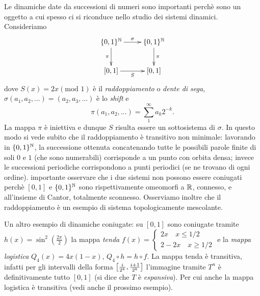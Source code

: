 \begin{esempio} Le dinamiche date da successioni di numeri sono importanti perchè sono un oggetto a cui 
spesso ci si riconduce nello studio dei sistemi dinamici. Consideriamo
\[ \xymatrix{ \{0,1\}^\N \ar[r]^\sigma \ar[d]_\pi & \{0,1\}^\N \ar[d]^\pi \\ [0,1] \ar[r]_S & [0,1] } \]
 dove $S(x)=2x(\mbox{mod } 1)$ è il \emph{raddoppiamento} o \emph{dente di sega}, $\sigma(a_1,a_2,\dots)=(a_2,a_3,\dots)$ è lo \emph{shift} e 
 \[\pi(a_1,a_2,\dots)=\sum_1^\infty a_k 2^{-k}.\]
 La mappa $\pi$ è iniettiva e dunque $S$ risulta essere un sottosistema di $\sigma$. In questo modo si vede subito che il raddoppiamento è transitivo non minimale: 
 lavorando in $\{0,1\}^{\mathbb{N}}$, la successione ottenuta concatenando tutte le possibili parole finite di soli $0$ e $1$ (che sono numerabili) corrisponde a un punto con orbita densa; 
 invece le successioni periodiche corrispondono a punti periodici (se ne trovano di ogni ordine). 
 \Eacc importante osservare che i due sistemi non possono essere coniugati perchè $[0,1]$ e $\{0,1\}^{\mathbb{N}}$ sono rispettivamente omeomorfi a $\mathbb{R}$, connesso, e all'insieme di Cantor, 
 totalmente sconnesso. \newline
 Osserviamo inoltre che il raddoppiamento è un esempio di sistema topologicamente mescolante.
\end{esempio}



\begin{esempio} Un altro esempio di dinamiche coniugate: 
su $[0,1]$ sono coniugate tramite $h(x)=\sin^2\left(\frac{2\pi}{2}\right)$ la mappa \emph{tenda} 
$f(x)=\begin{cases}2x \quad x\leq 1/2 \\ 2-2x \quad x\geq 1/2\end{cases}$ e la \emph{mappa logistica} $Q_4(x)=4x(1-x)$, $Q_4\circ h=h\circ f$.
La mappa tenda è transitiva, infatti per gli intervalli della forma $\left[\frac{i}{2^k},\frac{i+1}{2^k}\right]$ l'immagine
tramite $T^n$ è definitivamente tutto $[0,1]$ (si dice che $T$ è \emph{espansiva}). Per cui anche la mappa logistica è transitiva (vedi anche il prossimo esempio).
\end{esempio}



